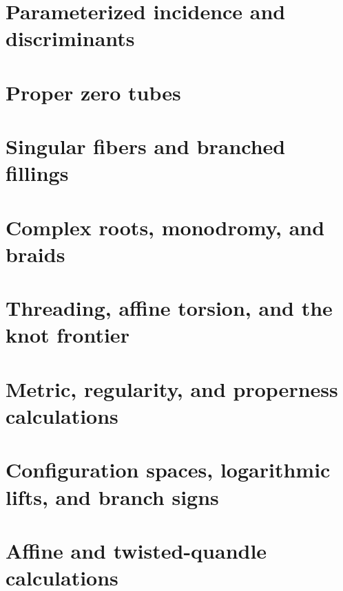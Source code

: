 \documentclass[11pt]{article}
\theoremstyle{definition}
\theoremstyle{remark}
\begin{document}
\section{Parameterized incidence and discriminants}
\label{sec:discriminants}


\section{Proper zero tubes}
\label{sec:regular-tubes}


\section{Singular fibers and branched fillings}
\label{sec:singular-fibers}


\section{Complex roots, monodromy, and braids}
\label{sec:braids}


\section{Threading, affine torsion, and the knot frontier}
\label{sec:threading}


\appendix

\section{Metric, regularity, and properness calculations}
\label{app:regularity}


\section{Configuration spaces, logarithmic lifts, and branch signs}
\label{app:configuration}


\section{Affine and twisted-quandle calculations}
\label{app:affine-quandle}




\end{document}
